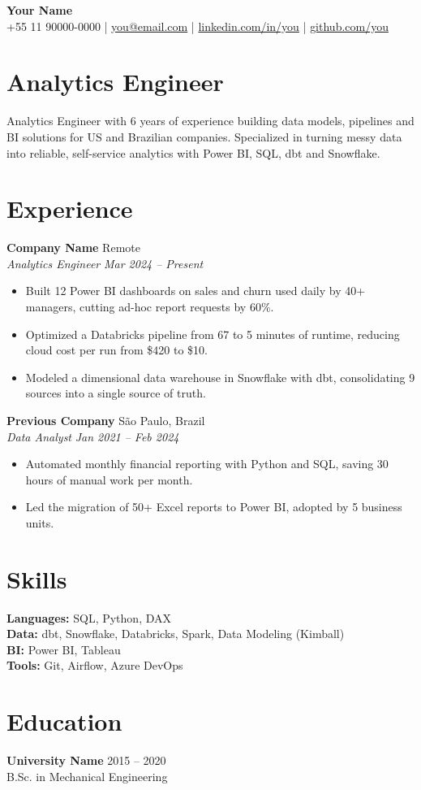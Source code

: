 \documentclass[letterpaper,10.5pt]{article}
\newcommand{\job}[4]{%
  \textbf{#1} \hfill #3\\
  \textit{#2} \hfill \textit{#4}\\[-6pt]}
\begin{document}
\begin{center}
  {\LARGE\bfseries Your Name}\\[3pt]
  +55 11 90000-0000 \;|\;
  \href{mailto:you@email.com}{you@email.com} \;|\;
  \href{https://linkedin.com/in/you}{linkedin.com/in/you} \;|\;
  \href{https://github.com/you}{github.com/you}
\end{center}

\section*{Analytics Engineer}
Analytics Engineer with 6 years of experience building data models, pipelines and BI solutions for US and Brazilian companies. Specialized in turning messy data into reliable, self-service analytics with Power BI, SQL, dbt and Snowflake.

\section*{Experience}

\job{Company Name}{Analytics Engineer}{Remote}{Mar 2024 -- Present}
\begin{itemize}
  \item Built 12 Power BI dashboards on sales and churn used daily by 40+ managers, cutting ad-hoc report requests by 60\%.
  \item Optimized a Databricks pipeline from 67 to 5 minutes of runtime, reducing cloud cost per run from \$420 to \$10.
  \item Modeled a dimensional data warehouse in Snowflake with dbt, consolidating 9 sources into a single source of truth.
\end{itemize}

\job{Previous Company}{Data Analyst}{São Paulo, Brazil}{Jan 2021 -- Feb 2024}
\begin{itemize}
  \item Automated monthly financial reporting with Python and SQL, saving 30 hours of manual work per month.
  \item Led the migration of 50+ Excel reports to Power BI, adopted by 5 business units.
\end{itemize}

\section*{Skills}
\textbf{Languages:} SQL, Python, DAX\\
\textbf{Data:} dbt, Snowflake, Databricks, Spark, Data Modeling (Kimball)\\
\textbf{BI:} Power BI, Tableau\\
\textbf{Tools:} Git, Airflow, Azure DevOps

\section*{Education}
\textbf{University Name} \hfill 2015 -- 2020\\
B.Sc. in Mechanical Engineering
\end{document}
